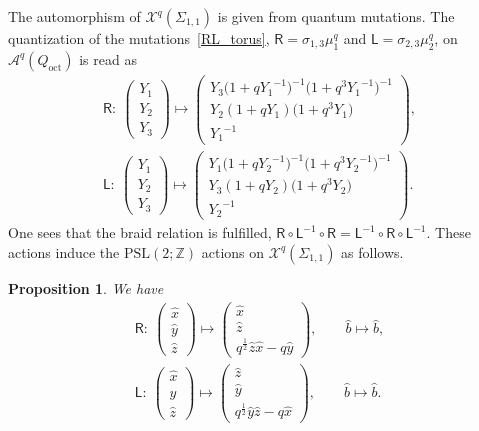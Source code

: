 \documentclass[10pt,a4paper]{amsart}
\numberwithin{equation}{section}
\newtheorem{Proposition}[Theorem]{Proposition}
 { \theoremstyle{definition}
\newtheorem{Definition}[Theorem]{Definition}
\newtheorem{Note}[Theorem]{Note}
\newtheorem{Example}[Theorem]{Example}
\newtheorem{Remark}[Theorem]{Remark} }
\begin{document}
The automorphism of $\mathcal{X}^q(\Sigma_{1,1})$ is given from quantum mutations. The quantization of the mutations~\eqref{RL_torus}, $ \mathsf{R} = \sigma_{1,3} \mu^q_1$ and $ \mathsf{L} = \sigma_{2,3} \mu^q_2 $, on~$\mathcal{A}^q(Q_{\text{oct}})$ is read as
\begin{gather*}
 \mathsf{R}\colon \ \begin{pmatrix}
 Y_1 \\ Y_2 \\Y_3
 \end{pmatrix}
 \mapsto
 \begin{pmatrix}
 Y_3 \big( 1 + q {Y_1}^{-1}\big)^{-1} \big( 1+q^3 {Y_1}^{-1} \big)^{-1} \\
 Y_2 ( 1+q Y_1) \big( 1+q^3 Y_1 \big) \\
 {Y_1}^{-1}
 \end{pmatrix}, \\
 \mathsf{L}\colon \
 \begin{pmatrix}
 Y_1 \\ Y_2 \\Y_3
 \end{pmatrix}
 \mapsto
 \begin{pmatrix}
 Y_1 \big( 1 + q {Y_2}^{-1}\big)^{-1} \big( 1+q^3 {Y_2}^{-1} \big)^{-1} \\
 Y_3 (1+q Y_2) \big( 1+q^3 Y_2 \big) \\
 {Y_2}^{-1}
 \end{pmatrix}.
\end{gather*}
One sees that the braid relation is fulfilled, $\mathsf{R} \circ \mathsf{L}^{-1} \circ \mathsf{R} =\mathsf{L}^{-1} \circ \mathsf{R} \circ \mathsf{L}^{-1}$. These actions induce the $\mathrm{PSL}(2;\mathbb{Z})$ actions on $\mathcal{X}^q(\Sigma_{1,1})$ as follows.
\begin{Proposition} We have
 \begin{gather*}
 \mathsf{R}\colon \ \begin{pmatrix}
 \hat{x} \\
 \hat{y} \\
 \hat{z}
 \end{pmatrix}
 \mapsto
 \begin{pmatrix}
 \hat{x} \\
 \hat{z} \\
 q^{\frac{1}{2}} \hat{z} \hat{x} - q \hat{y}
 \end{pmatrix} , \qquad
 \hat{b} \mapsto \hat{b}, \\
 \mathsf{L}\colon \ \begin{pmatrix}
 \hat{x} \\
 \hat{y} \\
 \hat{z}
 \end{pmatrix}
 \mapsto
 \begin{pmatrix}
 \hat{z} \\
 \hat{y} \\
 q^{\frac{1}{2}} \hat{y} \hat{z} - q \hat{x}
 \end{pmatrix}, \qquad
 \hat{b} \mapsto \hat{b}.
 \end{gather*}
\end{Proposition}
\end{document}
